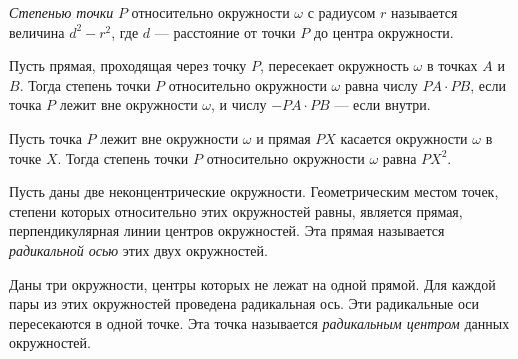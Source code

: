 \resetproblem \begingroup %
    \def\jeolmdate{30 ноября 2018 г.}%
    \def\jeolmauthors{Доледенок А.\,В., Орлов О.\,П.}%
\jeolmheader \endgroup


 \textit{Степенью точки} $P$ относительно окружности $\omega$ с радиусом $r$ называется величина $d^2 - r^2$, где $d$ --- расстояние от точки $P$ до центра окружности.

 Пусть прямая, проходящая через точку $P$, пересекает окружность $\omega$ в точках $A$ и $B$. Тогда степень точки $P$ относительно окружности $\omega$ равна числу $PA \cdot PB$, если точка $P$ лежит вне окружности $\omega$, и числу $-PA \cdot PB$ --- если внутри.

 Пусть точка $P$ лежит вне окружности $\omega$ и прямая $PX$ касается окружности $\omega$ в точке $X$. Тогда степень точки $P$ относительно окружности $\omega$ равна $PX^2$.

 Пусть даны две неконцентрические окружности. Геометрическим местом точек, степени которых относительно этих окружностей равны, является прямая, перпендикулярная линии центров окружностей. Эта прямая называется \textit{радикальной осью} этих двух окружностей. 

 Даны три окружности, центры которых не лежат на одной прямой. Для каждой пары из этих окружностей проведена радикальная ось. Эти радикальные оси пересекаются в одной точке. Эта точка называется \textit{радикальным центром} данных окружностей.

